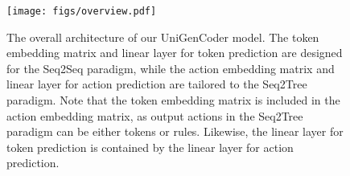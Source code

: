 \begin{figure}[t]
\centering
\footnotesize
\texttt{[image: figs/overview.pdf]}
\setlength{\abovecaptionskip}{0pt}
\caption{The overall architecture of our UniGenCoder model. The token embedding matrix and linear layer for token prediction are designed for the Seq2Seq paradigm, while the action embedding matrix and linear layer for action prediction are tailored to the Seq2Tree paradigm. Note that the token embedding matrix is included in the action embedding matrix, as output actions in the Seq2Tree paradigm can be either tokens or rules. Likewise, the linear layer for token prediction is contained by the linear layer for action prediction.} %
\label{fig:overview}
\vspace{-0.4cm}
\end{figure}